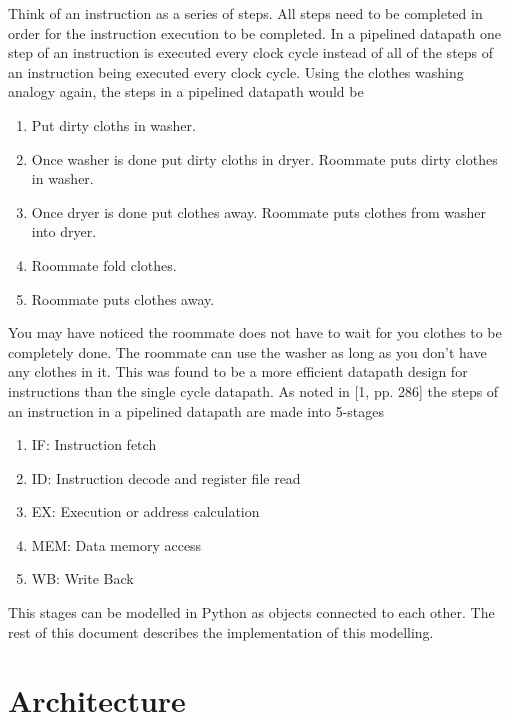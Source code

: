 \documentclass[conference]{IEEEtran}
\begin{document}
Think of an instruction as a series of steps.  All steps need to be completed in order for the instruction execution to be completed.  In a pipelined datapath one step of an instruction is executed every clock cycle instead of all of the steps of an instruction being executed every clock cycle.  Using the clothes washing analogy again, the steps in a pipelined datapath would be
\begin{enumerate}
    \item Put dirty cloths in washer.
    \item Once washer is done put dirty cloths in dryer.  Roommate puts dirty clothes in washer.
    \item Once dryer is done put clothes away.  Roommate puts clothes from washer into dryer.
    \item Roommate fold clothes.
    \item Roommate puts clothes away.
\end{enumerate}
You may have noticed the roommate does not have to wait for you clothes to be completely done.  The roommate can use the washer as long as you don't have any clothes in it.  This was found to be a more efficient datapath design for instructions than the single cycle datapath.
As noted in [1, pp. 286] the steps of an instruction in a pipelined datapath are made into 5-stages
\begin{enumerate}
\item IF: Instruction fetch
\item ID: Instruction decode and register file read
\item EX: Execution or address calculation
\item MEM: Data memory access
\item WB: Write Back
\end{enumerate}
This stages can be modelled in Python as objects connected to each other.  The rest of this document describes the implementation of this modelling.


\section{Architecture}
\end{document}
